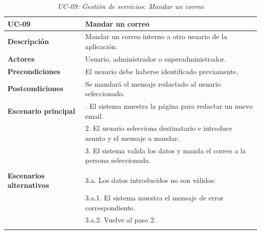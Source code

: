 \begin{table}
  \begin{center}
    \begin{tabularx}{16.4cm}{|l|X|}
      \hline
      \textbf{UC-09} & \textbf{Mandar un correo}\\
      \hline
      \textbf{Descripción} & Mandar un correo interno a otro usuario de la aplicación.\\
      \hline
      \textbf{Actores} & Usuario, administrador o superadministrador.\\
      \hline
      \textbf{Precondiciones} & El usuario debe haberse identificado previamente.\\
      \hline
      \textbf{Postcondiciones} & Se mandará el mensaje redactado al usuario seleccionado.\\
      \hline
      \textbf{Escenario principal} & \smallskip 1. El sistema muestra la página para redactar un nuevo email.\\
      & 2. El usuario selecciona destinatario e introduce asunto y el mensaje a mandar.\\
      & 3. El sistema valida los datos y manda el correo a la persona seleccionada.\\
      & \\
      \hline
      \textbf{Escenarios alternativos} & \smallskip 3.a. Los datos introducidos no son válidos:\\
      & \hspace{0.3cm} 3.a.1. El sistema muestra el mensaje de error correspondiente.\\
      & \hspace{0.3cm} 3.a.2. Vuelve al paso 2.\\
      & \\
      \hline
    \end{tabularx}
    \caption{\textit{UC-09: Gestión de servicios: Mandar un correo}}
    \label{tab:CU-mandar-correo}
  \end{center}
\end{table}


